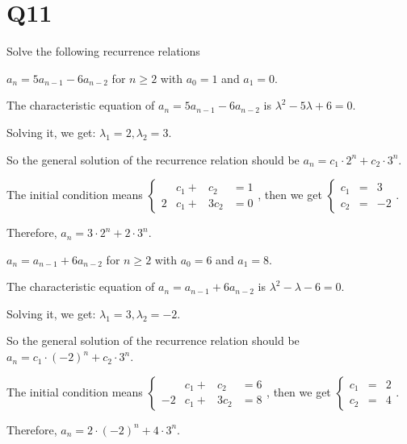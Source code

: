 \documentclass[11pt]{article}
\begin{document}
\section*{Q11}
Solve the following recurrence relations
\begin{qparts}
    
    \item $a_n=5a_{n-1}-6a_{n-2}$ for $n\ge 2$ with $a_0=1$ and $a_1=0$.
    \begin{solution}
        The characteristic equation of $a_n=5a_{n-1}-6a_{n-2}$ is $\lambda ^{2 }-5\lambda+6=0$. 
        
        Solving it, we get: $\lambda_1=2,\lambda_2=3$. 
    
    So the general solution of the recurrence relation should be $a_n=c_1\cdot 2^{n }+c_2\cdot 3^{n}$.

    The initial condition means 
    $\left\{
        \begin{alignedat}{2}
            &c_1+{}&c_2&=1\\
            2&c_1+{}&3c_2&=0
        \end{alignedat}
    \right.
    $, then we get $
    \left\{
        \begin{alignedat}{2}
            c_1&={}&3\\
            c_2&={}&-2
        \end{alignedat}
    \right.$.

    Therefore, $a_n=3\cdot 2^{n }+2\cdot 3^{n}$.
    \end{solution}
    

    \item $a_n=a_{n-1}+6a_{n-2}$ for $n\ge 2$ with $a_0=6$ and $a_1=8$.
    \begin{solution}
        The characteristic equation of $a_n=a_{n-1}+6a_{n-2}$ is $\lambda ^{2 }-\lambda-6=0$. 
    
    Solving it, we get: $\lambda_1=3,\lambda_2=-2$. 
    
    So the general solution of the recurrence relation should be $a_n=c_1\cdot (-2)^{n }+c_2\cdot 3^{n}$.

    The initial condition means 
    $\left\{
        \begin{alignedat}{2}
            &c_1+{}&c_2&=6\\
            -2&c_1+{}&3c_2&=8
        \end{alignedat}
    \right.
    $, then we get $
    \left\{
        \begin{alignedat}{2}
            c_1&={}&2\\
            c_2&={}&4
        \end{alignedat}
    \right.$.

    Therefore, $a_n=2\cdot (-2)^{n }+4\cdot 3^{n}$.
    \end{solution}
    
    
\end{qparts}
\end{document}
